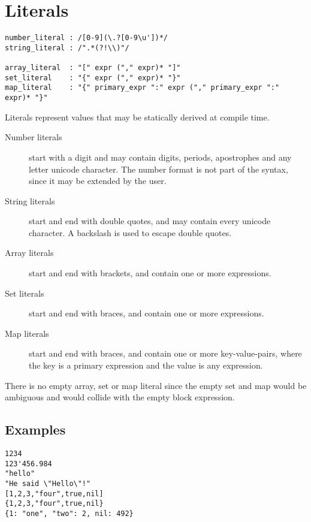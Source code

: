 \section{Literals}

\begin{verbatim}
number_literal : /[0-9](\.?[0-9\u'])*/
string_literal : /".*(?!\\)"/

array_literal  : "[" expr ("," expr)* "]"
set_literal    : "{" expr ("," expr)* "}"
map_literal    : "{" primary_expr ":" expr ("," primary_expr ":" expr)* "}"
\end{verbatim}

Literals represent values that may be statically derived at compile time.

\begin{description}
	\item[Number literals] start with a digit and may contain digits, periods,
		apostrophes and any letter unicode character. The number format is not
		part of the syntax, since it may be extended by the user.
	\item[String literals] start and end with double quotes, and may contain
		every unicode character. A backslash is used to escape double quotes.
	\item[Array literals] start and end with brackets, and contain one or more
		expressions.
	\item[Set literals] start and end with braces, and contain one or more
		expressions.
	\item[Map literals] start and end with braces, and contain one or more
		key-value-pairs, where the key is a primary expression and the value is
		any expression.
\end{description}

There is no empty array, set or map literal since the empty set and map would be
ambiguous and would collide with the empty block expression.

\subsection{Examples}

\begin{verbatim}
1234
123'456.984
"hello"
"He said \"Hello\"!"
[1,2,3,"four",true,nil]
{1,2,3,"four",true,nil}
{1: "one", "two": 2, nil: 492}
\end{verbatim}
